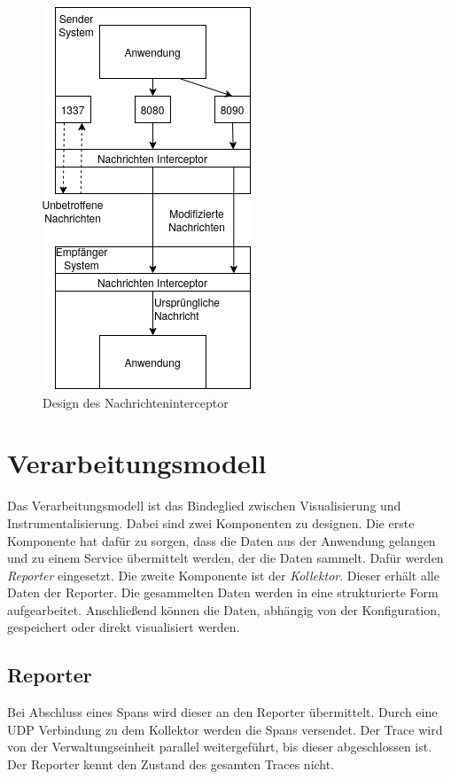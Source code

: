  \begin{figure}[]
 	\centering
 	\includegraphics[scale=0.6]{img/Design/Nachrichteninterceptor.png}
 	\caption[Design des Nachrichteninterceptor]{Design des Nachrichteninterceptor}
 	\label{fig:Nachrichteninterceptor}
 \end{figure}

\section{Verarbeitungsmodell}
\label{section:Verarbeitungsmodell}
Das Verarbeitungsmodell ist das Bindeglied zwischen Visualisierung und Instrumentalisierung. Dabei sind zwei Komponenten zu designen. Die erste Komponente hat dafür zu sorgen, dass die Daten aus der Anwendung gelangen und zu einem Service übermittelt werden, der die Daten sammelt. Dafür werden \emph{Reporter} eingesetzt. Die zweite Komponente ist der \emph{Kollektor}. Dieser erhält alle Daten der Reporter. Die gesammelten Daten werden in eine strukturierte Form aufgearbeitet. Anschließend können die Daten, abhängig von der Konfiguration, gespeichert oder direkt visualisiert werden.

\subsection{Reporter}
\label{subsection:Reporter}
Bei Abschluss eines Spans wird dieser an den Reporter übermittelt. Durch eine UDP Verbindung zu dem Kollektor werden die Spans versendet. Der Trace wird von der Verwaltungseinheit parallel weitergeführt, bis dieser abgeschlossen ist. Der Reporter kennt den Zustand des gesamten Traces nicht. 

